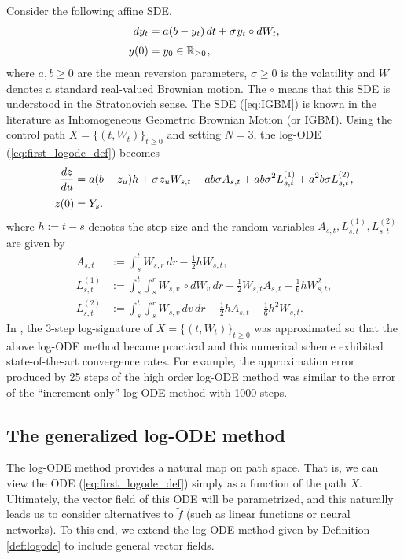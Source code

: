 \begin{example} Consider the following affine SDE,
\begin{align}\label{eq:IGBM}
dy_t & = a(b-y_t)\,dt + \sigma\hspace{0.25mm} y_t\circ dW_t,\\[3pt]
y(0) & = y_0\in\mathbb{R}_{\geq 0}\hspace{0.25mm},\nonumber
\end{align}
where $a,b\geq 0$ are the mean reversion parameters, $\sigma\geq 0$ is the volatility and $W$ denotes a standard real-valued Brownian motion. The $\circ$ means that this SDE is understood in the Stratonovich sense.
The SDE (\ref{eq:IGBM}) is known in the literature as Inhomogeneous Geometric Brownian Motion (or IGBM).
Using the control path $X = \{(t, W_t)\}_{t\geq 0}$ and setting $N = 3$, the log-ODE (\ref{eq:first_logode_def}) becomes
\begin{align*}
\frac{dz}{du} & = a(b-z_u)h + \sigma\hspace{0.25mm} z_u W_{s,t} - ab\sigma A_{s,t} + ab\sigma^2 L_{s,t}^{(1)} + a^2b\sigma L_{s,t}^{(2)},\\[3pt]
z(0) & = Y_s.
\end{align*}
where $h := t- s$ denotes the step size and the random variables $A_{s,t}, L_{s,t}^{(1)}, L_{s,t}^{(2)}$ are given by
\begin{align*}
A_{s,t} & := \int_s^t W_{s,r}\,dr - \frac{1}{2}hW_{s,t},\\[3pt]
L_{s,t}^{(1)} & := \int_s^t\int_s^r W_{s,v}\,\circ dW_v\,dr - \frac{1}{2}W_{s,t}A_{s,t} - \frac{1}{6}hW_{s,t}^2,\\[3pt]
L_{s,t}^{(2)} & := \int_s^t\int_s^r W_{s,v}\,dv\,dr - \frac{1}{2}h A_{s,t} - \frac{1}{6}h^2W_{s,t}.
\end{align*}
In \cite{foster2020poly}, the $3$-step log-signature of $X = \{(t, W_t)\}_{t\geq 0}$ was approximated so that the above log-ODE method became practical and this numerical scheme exhibited state-of-the-art convergence rates. For example, the approximation error produced by 25 steps of the
high order log-ODE method was similar to the error of the ``increment only'' log-ODE method with 1000 steps.
\end{example}

\subsection{The generalized log-ODE method}

The log-ODE method provides a natural map on path space. That is, we can view the ODE (\ref{eq:first_logode_def}) simply as a function of the path $X$. Ultimately, the vector field of this ODE will be parametrized,
and this naturally leads us to consider alternatives to $\tilde{f}$ (such as linear functions or neural networks).
To this end, we extend the log-ODE method given by Definition \ref{def:logode} to include general vector fields.

